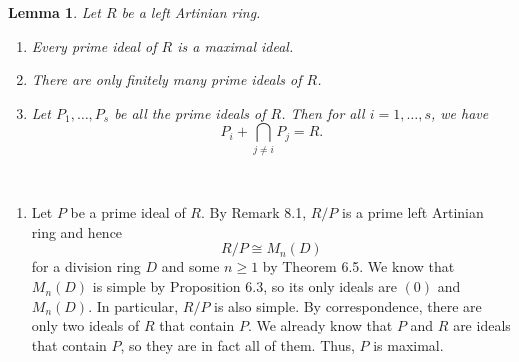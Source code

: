 \documentclass[10pt]{article}
\makeatletter
\numberwithin{equation}{section}
\theoremstyle{newstyle}
\newtheorem{lemma}[thm]{Lemma}
\newenvironment{pf}[1][\proofname]{\par
  \pushQED{\qed}%
  \normalfont \topsep0\p@\relax
  \trivlist
  \item[\hskip\labelsep\scshape
  #1\@addpunct{.}]\ignorespaces
}{%
  \popQED\endtrivlist\@endpefalse
}
\makeatother
\begin{document}
\begin{lemma}
Let $R$ be a left Artinian ring. 
\begin{enumerate}[(1)]
    \item Every prime ideal of $R$ is a maximal ideal. 
    \item There are only finitely many prime ideals of $R$. 
    \item Let $P_1, \dots, P_s$ be all the prime ideals of $R$. Then for all $i = 1, \dots, s$, we have 
    \[ P_i + \bigcap_{j \neq i} P_j = R. \]
\end{enumerate}
\end{lemma}
\begin{pf}~
\begin{enumerate}[(1)]
    \item Let $P$ be a prime ideal of $R$. By Remark 8.1, $R/P$ is a prime left Artinian ring 
    and hence 
    \[ R/P \cong M_n(D) \]
    for a division ring $D$ and some $n \geq 1$ by Theorem 6.5. We know that $M_n(D)$ is simple by 
    Proposition 6.3, so its only ideals are $(0)$ and $M_n(D)$. In particular, $R/P$ is also simple. 
    By correspondence, there are only two ideals of $R$ that contain $P$. We already know that 
    $P$ and $R$ are ideals that contain $P$, so they are in fact all of them. Thus, $P$ is 
    maximal. 
    

\end{enumerate}
\end{pf}
\end{document}
